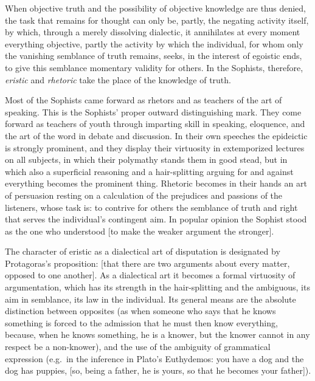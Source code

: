 When objective truth and the possibility of objective knowledge are thus
denied, the task that remains for thought can only be, partly, the negating
activity itself, by which, through a merely dissolving dialectic, it
annihilates at every moment everything objective, partly the activity by
which the individual, for whom only the vanishing semblance of truth remains,
seeks, in the interest of egoistic ends, to give this semblance momentary
validity for others. In the Sophists, therefore, \emph{eristic} and
\emph{rhetoric} take the place of the knowledge of truth.

Most of the Sophists came forward as rhetors and as teachers of the art of
speaking. This is the Sophists' proper outward distinguishing mark. They come
forward as teachers of youth through imparting skill in speaking, eloquence,
and the art of the word in debate and discussion. In their own speeches the
epideictic is strongly prominent, and they display their virtuosity in
extemporized lectures on all subjects, in which their polymathy stands them
in good stead, but in which also a superficial reasoning and a hair-splitting
arguing for and against everything becomes the prominent thing. Rhetoric
becomes in their hands an art of persuasion resting on a calculation of the
prejudices and passions of the listeners, whose task is: to contrive for
others the semblance of truth and right that serves the
individual's contingent aim. In popular opinion the Sophist stood
as the one who understood  [to make the
weaker argument the stronger].

The character of eristic as a dialectical art of disputation is designated by
Protagoras's proposition: 
[that there are two arguments about every matter, opposed to one another]. As
a dialectical art it becomes a formal virtuosity of argumentation, which has
its strength in the hair-splitting and the ambiguous, its aim in semblance,
its law in the individual. Its general means are the absolute distinction
between opposites (as when someone who says that he knows something is forced
to the admission that he must then know everything, because, when he knows
something, he is a knower, but the knower cannot in any respect be a
non-knower), and the use of the ambiguity of grammatical expression (e.g.\ in
the inference in Plato's Euthydemos: you have a dog and the dog has puppies,
 [so, being a father, he is yours, so that he becomes
your father]).

